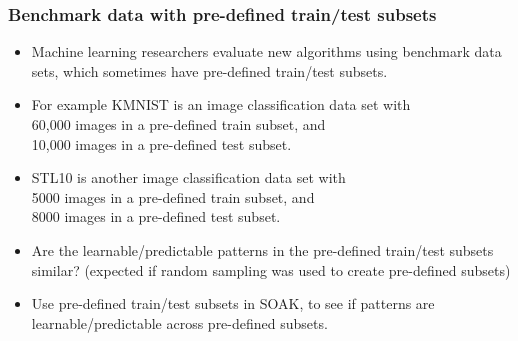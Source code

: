 \documentclass[t]{beamer}
\begin{document}
\begin{frame}
  \frametitle{Benchmark data with pre-defined train/test subsets}
  \begin{itemize}
  \item Machine learning researchers evaluate new algorithms using
    benchmark data sets, which sometimes have pre-defined train/test
    subsets.
  \item For example KMNIST is an image classification data set with \\
    60,000 images in a pre-defined train subset, and \\
    10,000 images in a pre-defined test subset.
  \item STL10 is another image classification data set with \\
    5000 images in a pre-defined train subset, and \\
    8000 images in a pre-defined test subset.
  \item Are the learnable/predictable patterns in the pre-defined train/test subsets
    similar? (expected if random sampling was used to create pre-defined subsets)
  \item Use pre-defined train/test subsets in SOAK, to see if patterns are learnable/predictable across pre-defined subsets.
  \end{itemize}
\end{frame}
\end{document}
